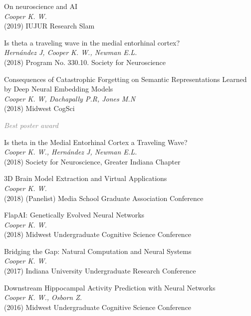 \documentclass[10pt]{cooperCV2}
\begin{document}
\begin{etaremune}[itemindent=-\bibhang, topsep=0pt,
				   itemsep=\bibsep,partopsep=0pt,parsep=0pt,leftmargin={\bibhang+\widthof{[999]}}]
	
    \item On neuroscience and AI \\
     \textit{Cooper K. W.}\\
     (2019) IUJUR Research Slam
     
	
    \item Is theta a traveling wave in the medial entorhinal cortex? \\
     \textit{Hernández J, Cooper K. W., Newman E.L.}\\
     (2018) Program No. 330.10. Society for Neuroscience
     
	
    \item Consequences of Catastrophic Forgetting on Semantic Representations Learned by Deep Neural Embedding Models \\
     \textit{Cooper K. W, Dachapally P.R, Jones M.N}\\
     (2018) Midwest CogSci
     
     	\begin{innerlist}
     	
	     \item  \textcolor{grey}{\textit{Best poster award} }
     	
     	\end{innerlist}
     
	
    \item Is theta in the Medial Entorhinal Cortex a Traveling Wave? \\
     \textit{Cooper K. W., Hernández J, Newman E.L.}\\
     (2018) Society for Neuroscience, Greater Indiana Chapter
     
	
    \item 3D Brain Model Extraction and Virtual Applications \\
     \textit{Cooper K. W.}\\
     (2018) (Panelist) Media School Graduate Association Conference
     
	
    \item FlapAI: Genetically Evolved Neural Networks \\
     \textit{Cooper K. W.}\\
     (2018) Midwest Undergraduate Cognitive Science Conference
     
	
    \item Bridging the Gap: Natural Computation and Neural Systems \\
     \textit{Cooper K. W.}\\
     (2017) Indiana University Undergraduate Research Conference
     
	
    \item Downstream Hippocampal Activity Prediction with Neural Networks \\
     \textit{Cooper K. W., Osborn Z.}\\
     (2016) Midwest Undergraduate Cognitive Science Conference
     
	


\end{etaremune}
\end{document}

